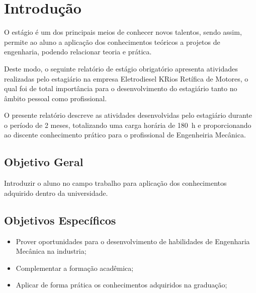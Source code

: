 \chapter{Introdução}\label{ch:introducao}

O estágio é um dos principais meios de conhecer novos talentos, sendo assim, permite ao aluno 
a aplicação dos conhecimentos teóricos a projetos de engenharia, podendo relacionar teoria e prática.

Deste modo, o seguinte relatório de estágio obrigatório apresenta atividades realizadas pelo estagiário 
na empresa Eletrodiesel KRios Retífica de Motores, o qual foi de total importância para o 
desenvolvimento do estagiário tanto no âmbito pessoal como profissional. 

O presente relatório descreve as atividades desenvolvidas pelo estagiário durante o período de 2 meses, 
totalizando uma carga horária de 180~h e proporcionando ao discente conhecimento prático 
para o profissional de Engenheiria Mecânica.

\section{Objetivo Geral}\label{sec:objetivogeral}

Introduzir o aluno no campo trabalho para aplicação dos conhecimentos adquirido dentro da
universidade.

\section{Objetivos Específicos}\label{sec:objetivoesp}

\begin{itemize}
	\item Prover oportunidades para o desenvolvimento de habilidades de Engenharia Mecânica na industria;
	\item Complementar a formação acadêmica;
	\item Aplicar de forma prática os conhecimentos adquiridos na graduação;
\end{itemize}

